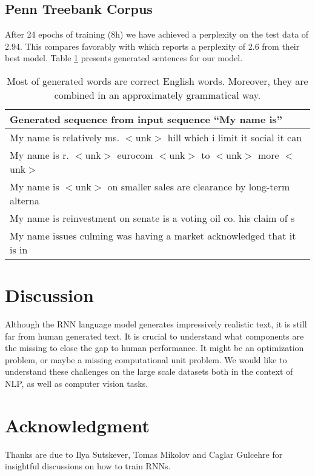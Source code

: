 \documentclass{article}
\begin{document}
\subsection{Penn Treebank Corpus}
After 24 epochs of training (8h) we have achieved a perplexity on the
test data of 2.94. This compares favorably with
\cite{mikolov2012statistical} which reports a perplexity of 2.6 from
their best model.
Table \ref{tab:penn} presents generated sentences for our model.


\begin{table}[t]
\tiny
\centering
\begin{tabular}{l}
\hline
Generated sequence from input sequence ``My name is'' \\
\hline
My name is relatively ms. $<$unk$>$ hill which i limit it social it can \\
My name is r. $<$unk$>$ eurocom $<$unk$>$ to $<$unk$>$ more $<$unk$>$ \\
My name is $<$unk$>$ on smaller sales are clearance by long-term alterna\\
My name is reinvestment on senate is a voting oil co. his claim of s\\
My name issues culming was having a market acknowledged that it is in \\

\hline
\end{tabular}
\caption{Most of generated words are correct English words. Moreover, they
are combined in an approximately grammatical way.}
        \label{tab:penn}
\end{table}


\section{Discussion}
Although the RNN language model generates impressively realistic text,
it is still far from
human generated text. It is crucial to understand what components are
the missing to close the gap to human performance. It might be an optimization problem, or
maybe a missing computational unit problem. We would like to understand these challenges
on the large scale datasets both in the context of NLP, as well as computer vision tasks.


\section{Acknowledgment}
Thanks are due to Ilya Sutskever, Tomas Mikolov and Caglar Gulcehre
for insightful discussions on how to train RNNs.



\end{document}
